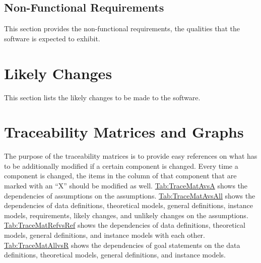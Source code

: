 \documentclass[12pt]{article}
\begin{document}
\subsection{Non-Functional Requirements}
\label{Sec:NFRs}
This section provides the non-functional requirements, the qualities that the software is expected to exhibit.

\section{Likely Changes}
\label{Sec:LCs}
This section lists the likely changes to be made to the software.

\section{Traceability Matrices and Graphs}
\label{Sec:TraceMatrices}
The purpose of the traceability matrices is to provide easy references on what has to be additionally modified if a certain component is changed. Every time a component is changed, the items in the column of that component that are marked with an ``X'' should be modified as well. \hyperref[Table:TraceMatAvsA]{Tab:TraceMatAvsA} shows the dependencies of assumptions on the assumptions. \hyperref[Table:TraceMatAvsAll]{Tab:TraceMatAvsAll} shows the dependencies of data definitions, theoretical models, general definitions, instance models, requirements, likely changes, and unlikely changes on the assumptions. \hyperref[Table:TraceMatRefvsRef]{Tab:TraceMatRefvsRef} shows the dependencies of data definitions, theoretical models, general definitions, and instance models with each other. \hyperref[Table:TraceMatAllvsR]{Tab:TraceMatAllvsR} shows the dependencies of goal statements on the data definitions, theoretical models, general definitions, and instance models.
\end{document}
